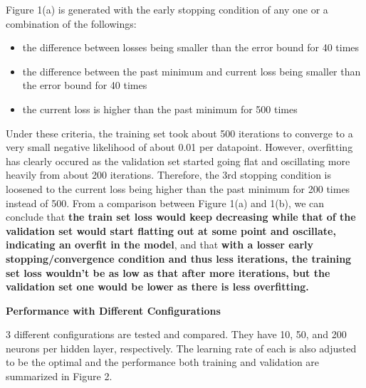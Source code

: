 \documentclass{article} %
\begin{document}
  Figure 1(a) is generated with the early stopping condition of any one or a combination of the followings: %
  \begin{itemize}
    \item the difference between losses being smaller than the error bound for 40 times
    \item the difference between the past minimum and current loss being smaller than the error bound for 40 times
    \item the current loss is higher than the past minimum for 500 times
  \end{itemize}
  Under these criteria, the training set took about 500 iterations to converge to a very small negative likelihood of about 0.01 per datapoint. However, overfitting has clearly occured as the validation set started going flat and oscillating more heavily from about 200 iterations. Therefore, the 3rd stopping condition is loosened to the current loss being higher than the past minimum for 200 times instead of 500. From a comparison between Figure 1(a) and 1(b), we can conclude that \textbf{the train set loss would keep decreasing while that of the validation set would start flatting out at some point and oscillate, indicating an overfit in the model}, and that \textbf{with a losser early stopping/convergence condition and thus less iterations, the training set loss wouldn't be as low as that after more iterations, but the validation set one would be lower as there is less overfitting.}


\vspace{1cm}
\textbf{Performance with Different Configurations}

  3 different configurations are tested and compared. They have 10, 50, and 200 neurons per hidden layer, respectively. The learning rate of each is also adjusted to be the optimal and the performance both training and validation are summarized in Figure 2.

\end{document}
